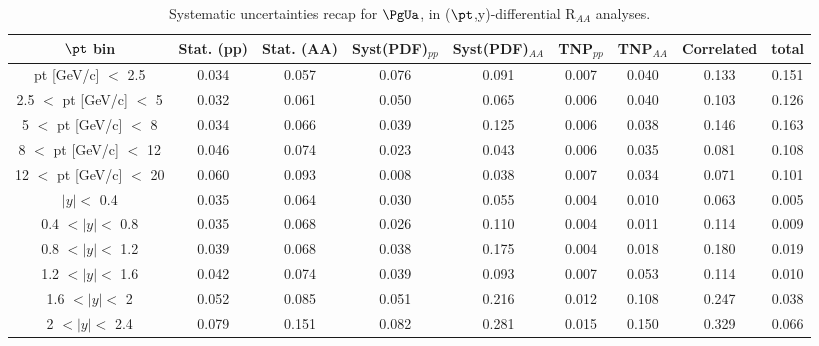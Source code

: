 \begin{landscape}
\begin{table}[p]
  \begin{centering}
      \begin{tabular}{|c|c|c|c|c|c|c|c|c|}
        \hline
        $\pt$ bin & Stat. (pp) & Stat. (AA) & Syst(PDF)$_{pp}$ & Syst(PDF)$_{AA}$ & TNP$_{pp}$ &  TNP$_{AA}$ & Correlated &
        total\\
        \hline
        pt [{\rm GeV}/c] $<$ 2.5 & 0.034 & 0.057 & 0.076 & 0.091 & 0.007 & 0.040 & 0.133 & 0.151      \\
        2.5 $<$ pt [{\rm GeV}/c] $<$ 5 & 0.032 & 0.061 & 0.050 & 0.065 & 0.006 & 0.040 & 0.103 & 0.126\\
        5 $<$ pt [{\rm GeV}/c] $<$ 8 & 0.034 & 0.066 & 0.039 & 0.125 & 0.006 & 0.038 & 0.146 & 0.163  \\
        8 $<$ pt [{\rm GeV}/c] $<$ 12 & 0.046 & 0.074 & 0.023 & 0.043 & 0.006 & 0.035 & 0.081 & 0.108 \\
        12 $<$ pt [{\rm GeV}/c] $<$ 20 & 0.060 & 0.093 & 0.008 & 0.038 & 0.007 & 0.034 & 0.071 & 0.101\\
        \hline
        \hline
        $|y| <$ 0.4 & 0.035 & 0.064 &  0.030 & 0.055 & 0.004 & 0.010 &        0.063 & 0.005 \\
        0.4 $< |y| <$ 0.8   & 0.035 & 0.068 &  0.026 & 0.110 & 0.004 & 0.011 & 0.114 & 0.009\\
        0.8 $< |y| <$ 1.2  & 0.039 & 0.068 &  0.038 & 0.175 & 0.004 & 0.018 & 0.180 & 0.019 \\
        1.2 $< |y| <$ 1.6  & 0.042 & 0.074 &  0.039 & 0.093 & 0.007 & 0.053 & 0.114 & 0.010 \\
        1.6 $< |y| <$ 2    & 0.052 & 0.085 &  0.051 & 0.216 & 0.012 & 0.108 & 0.247 & 0.038 \\
        2 $< |y| <$ 2.4    & 0.079 & 0.151 &  0.082 & 0.281 & 0.015 & 0.150 & 0.329 & 0.066\\
      \end{tabular}
      \caption{Systematic uncertainties recap for $\PgUa$, in
        ($\pt$,y)-differential  R$_{AA}$ analyses. }  
      \label{tab:breakdown}
    \end{centering}
\end{table}
\end{landscape}

